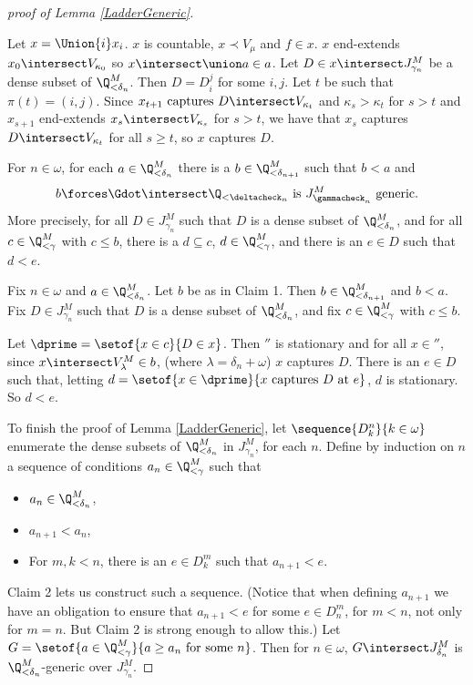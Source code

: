 \documentclass[oneside,12pt]{amsart}
\begin{document}
\begin{proof}[proof of Lemma  \ref{LadderGeneric}]
\begin{subproof}
Let $x = \Union{i} x_i$. $x$ is countable, $x \prec V_{\mu}$ and $f\in x$.
$x$ end-extends $x_0\intersect V_{\kappa_0}$ so
$x\intersect\union a \in a$.
Let $D\in x\intersect J^M_{\gamma_n}$ be a dense subset of $\Q_{<\delta_n}^M$.
Then $D=D_i^j$ for some $i,j$. Let $t$ be such that $\pi(t) = (i,j)$.
Since $x_{t+1} \text{ captures } D \intersect V_{\kappa_t}$ and $\kappa_s > \kappa_t$ for $s>t$
and $x_{s+1}$ end-extends $x_s\intersect V_{\kappa_s}$ for $s>t$, we have that $x_s$ captures $D\intersect V_{\kappa_t}$ for all $s\geq t$, so $x$ captures $D$.
\end{subproof}

\begin{claim}[Claim 2]
For $n\in\omega$, for each $a\in \Q_{<\delta_n}^M$ there is a $b\in \Q_{<\delta_{n+1}}^M$ such
that $b < a$ and
$$b\forces\Gdot\intersect \Q_{<\deltacheck_n}\text{ is } J^M_{\gammacheck_n}\text{ generic.}$$
More precisely,
for all $D\in J^M_{\gamma_n}$ such that $D$ is a dense
subset of $\Q_{<\delta_n}^M$, and for all $c\in \Q_{<\gamma}^M$ with
$c\leq b$, there is a $d\subseteq c$, $d\in \Q_{<\gamma}^M$, and
there is an $e\in D$ such that $d < e$.
\end{claim}
\begin{subproof}
Fix $n\in\omega$ and $a\in \Q_{<\delta_n}^M$. Let $b$ be as in Claim 1.
Then $b\in \Q_{<\delta_{n+1}}^M$ and
$b<a$. Fix $D\in J^M_{\gamma_n}$ such that $D$ is a dense
subset of $\Q_{<\delta_n}^M$, and fix $c\in \Q_{<\gamma}^M$ with
$c\leq b$.

Let $\dprime=\setof{x\in c}{D\in x}$. Then $\dprime$ is stationary
and for all $x\in\dprime$, since $x\intersect V^M_{\lambda}\in b$, (where $\lambda = \delta_n + \omega$)
$x$ captures $D$. There is an $e\in D$ such that, letting
$d=\setof{x\in\dprime}{x \text{ captures } D \text{ at } e}$, $d$ is stationary.
So $d<e$.
\end{subproof}

To finish the proof of Lemma  \ref{LadderGeneric}, let
$\sequence{D^n_k}{k\in\omega}$ enumerate the dense subsets of
$\Q_{<\delta_n}^M$ in $J^M_{\gamma_n}$, for each $n$. Define by induction on
$n$ a sequence of conditions $a_n\in\Q_{<\gamma}^M$ such that
\begin{itemize}
\item $a_n\in\Q^M_{<\delta_n}$,
\item $a_{n+1} < a_n$,
\item For $m,k < n$, there is an $e\in D^m_k$ such that $a_{n+1}<e$.
\end{itemize}
Claim 2 lets us construct such a sequence. (Notice that when defining
$a_{n+1}$ we have an obligation to ensure that $a_{n+1}<e$ for some
$e\in D^m_n$, for $m<n$, not only for $m=n$. But Claim 2 is strong enough
to allow this.)
Let $G=\setof{a\in \Q_{<\gamma}^M}{a\geq a_n \text{ for some } n}$.
Then for $n\in\omega$,
$G\intersect J^M_{\delta_n}$ is $\Q_{<\delta_n}^M$-generic over $J^M_{\gamma_n}$.

\end{proof}
\end{document}
